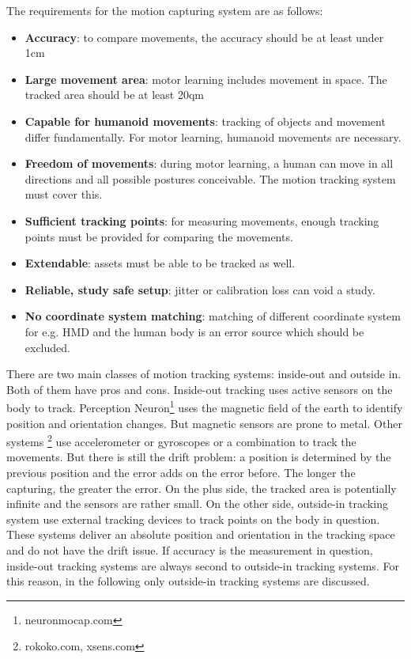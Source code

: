 The requirements for the motion capturing system are as follows: 
\begin{itemize}
	\item \textbf{Accuracy}: to compare movements, the accuracy should be at least under 1cm
	\item \textbf{Large movement area}: motor learning includes movement in space. The tracked area should be at least 20qm
	\item \textbf{Capable for humanoid movements}: tracking of objects and movement differ fundamentally. For motor learning, humanoid movements are necessary.
	\item \textbf{Freedom of movements}: during motor learning, a human can move in all directions and all possible postures conceivable. The motion tracking system must cover this.
	\item \textbf{Sufficient tracking points}: for measuring movements, enough tracking points must be provided for comparing the movements.
	\item \textbf{Extendable}: assets must be able to be tracked as well.
	\item \textbf{Reliable, study safe setup}: jitter or calibration loss can void a study.
	\item \textbf{No coordinate system matching}: matching of different coordinate system for e.g. HMD and the human body is an error source which should be excluded.
\end{itemize}
There are two main classes of motion tracking systems: inside-out and outside in. Both of them have pros and cons. Inside-out tracking uses active sensors on the body to track. Perception Neuron\footnote{neuronmocap.com} uses the magnetic field of the earth to identify position and orientation changes. But magnetic sensors are prone to metal. Other systems \footnote{rokoko.com, xsens.com} use accelerometer or gyroscopes or a combination to track the movements. But there is still the drift problem: a position is determined by the previous position and the error adds on the error before. The longer the capturing, the greater the error. On the plus side, the tracked area is potentially infinite and the sensors are rather small. On the other side, outside-in tracking system use external tracking devices to track points on the body in question. These systems deliver an absolute position and orientation in the tracking space and do not have the drift issue. If accuracy is the measurement in question, inside-out tracking systems are always second to outside-in tracking systems. For this reason, in the following only outside-in tracking systems are discussed. %

